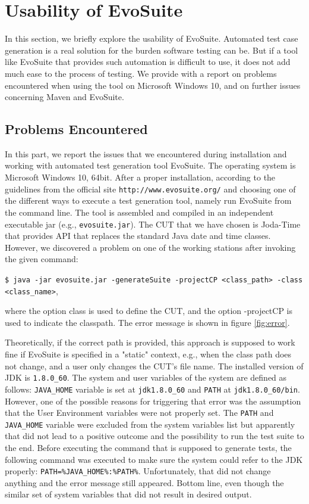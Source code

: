 \section{Usability of EvoSuite}

In this section, we briefly explore the usability of EvoSuite.
Automated test case generation is a real solution for the burden software testing can be. 
But if a tool like EvoSuite that provides such automation is difficult to use, it does not add much ease to the process of testing. 
We provide with a report on problems encountered when using the tool on Microsoft Windows 10, and on further issues concerning Maven and EvoSuite. 

\subsection{Problems Encountered}

In this part, we report the issues that we encountered during installation and working with automated test generation tool EvoSuite. 
The operating system is Microsoft Windows 10, 64bit. 
After a proper installation, according to the guidelines from the official site \verb|http://www.evosuite.org/| and choosing one of the different ways to execute a test generation tool, namely run EvoSuite from the command line. 
The tool is assembled and compiled in an independent executable jar (e.g., \verb|evosuite.jar|). 
The CUT that we have chosen is Joda-Time that provides API that replaces the standard Java date and time classes. 
However, we discovered a problem on one of the working stations after invoking the given command: 

\verb|$ java -jar evosuite.jar -generateSuite -projectCP <class_path> -class <class_name>|,

where the option \-class is used to define the CUT, and the option -projectCP is used to indicate the classpath.
The error message is shown in figure \ref{fig:error}.

Theoretically, if the correct path is provided, this approach is supposed to work fine if EvoSuite is specified in a "static" context, e.g., when the class path does not change, and a user only changes the CUT's file name.
The installed version of JDK is \verb|1.8.0_60|. 
The system and user variables of the system are defined as follows: \verb|JAVA_HOME| variable is set at \verb|jdk1.8.0_60| and \verb|PATH| at \verb|jdk1.8.0_60/bin|.
However, one of the possible reasons for triggering that error was the assumption that the User Environment variables were not properly set. 
The \verb|PATH| and \verb|JAVA_HOME| variable were excluded from the system variables list but apparently that did not lead to a positive outcome and the possibility to run the test suite to the end. 
Before executing the command that is supposed to generate tests, the following command was executed to make sure the system could refer to the JDK properly: \verb|PATH=%JAVA_HOME%:%PATH%|. 
Unfortunately, that did not change anything and the error message still appeared. 
Bottom line, even though the similar set of system variables that did not result in desired output.

